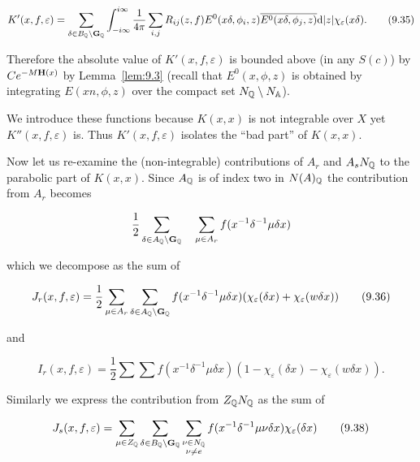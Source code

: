 \begin{equation}\label{eq:9.35}
K'(x, f, \varepsilon) = \sum_{\delta \in B_{\mathbb{Q}} \backslash \mathbf{G}_{\mathbb{Q}}}\int_{-i\infty}^{i\infty}\frac{1}{4\pi}\sum_{i, j} R_{ij}(z, f)E^0(x\delta, \phi_i, z)\overline{E^0(x\delta, \phi_j, z)}\mathrm{d}|z|\chi_\varepsilon(x\delta).\tag{9.35}
\end{equation}

Therefore the absolute value of $K'(x, f, \varepsilon)$ is bounded above (in any $S(c)$) by $Ce^{-M\mathbf{H}(x)}$ by Lemma~\ref{lem:9.3} (recall that $E^0(x, \phi, z)$ is obtained by integrating $E(xn, \phi, z)$ over the compact set $N_{\mathbb{Q}} \setminus N_{\mathbb{A}}$).

\begin{remark*}

We introduce these functions because $K(x,x)$ is not integrable over $X$ yet $K''(x,f,\varepsilon)$ is. Thus $K'(x,f,\varepsilon)$ isolates the ``bad part'' of $K(x,x)$.

\end{remark*}

Now let us re-examine the (non-integrable) contributions of $A_r$ and $A_sN_{\mathbb{Q}}$ to the parabolic part of $K(x, x)$. Since $A_{\mathbb{Q}}$ is of index two in $N(A)_{\mathbb{Q}}$ the contribution from $A_r$ becomes

\[
\frac{1}{2}\sum_{\delta \in A_{\mathbb{Q}} \backslash \mathbf{G}_{\mathbb{Q}}}\quad \sum_{\mu \in A_r} f(x^{-1}\delta^{-1}\mu\delta x)
\]

which we decompose as the sum of

\begin{equation}\label{eq:9.36}
J_r(x, f, \varepsilon) = \frac{1}{2}\sum_{\mu \in A_r}\sum_{\delta \in A_{\mathbb{Q}} \backslash \mathbf{G}_{\mathbb{Q}}} f(x^{-1}\delta^{-1}\mu\delta x)(\chi_\varepsilon(\delta x) + \chi_\varepsilon(w\delta x))\tag{9.36}
\end{equation}

and

\begin{equation}\label{eq:9.37}
I_r(x, f, \varepsilon) = \frac{1}{2}\sum\sum f(x^{-1}\delta^{-1}\mu\delta x)(1 - \chi_\varepsilon(\delta x) - \chi_\varepsilon(w\delta x)).\tag{9.37}
\end{equation}

Similarly we express the contribution from $Z_{\mathbb{Q}} N_{\mathbb{Q}}$ as the sum of

\begin{equation}\label{eq:9.38}
J_s(x, f, \varepsilon) = \sum_{\mu \in Z_{\mathbb{Q}}}\sum_{\delta \in B_{\mathbb{Q}} \backslash \mathbf{G}_{\mathbb{Q}}}\sum_{\substack{\nu \in N_{\mathbb{Q}}\\ \nu \neq e}} f(x^{-1}\delta^{-1}\mu\nu\delta x)\chi_\varepsilon(\delta x)\tag{9.38}
\end{equation}

